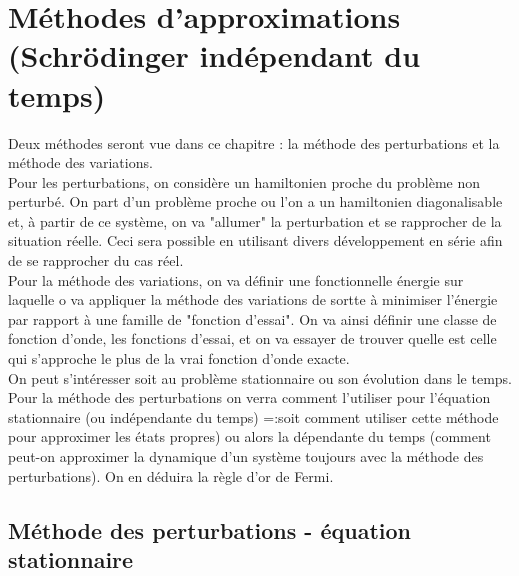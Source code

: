 \chapter{Méthodes d'approximations (Schrödinger indépendant du temps)}
Deux méthodes seront vue dans ce chapitre : la méthode des perturbations 
et la méthode des variations. \\

Pour les perturbations, on considère un hamiltonien proche du problème non perturbé. 
On part d'un problème proche ou l'on a un hamiltonien diagonalisable et, à partir de 
ce système, on va "allumer" la perturbation et se rapprocher de la situation réelle. 
Ceci sera possible en utilisant divers développement en série afin de se rapprocher 
du cas réel.\\

Pour la méthode des variations, on va définir une fonctionnelle énergie sur laquelle 
o va appliquer la méthode des variations de sortte à minimiser l'énergie par rapport 
à une famille de "fonction d'essai". On va ainsi définir une classe de fonction d'onde, 
les fonctions d'essai, et on va essayer de trouver quelle est celle qui s'approche le 
plus de la vrai fonction d'onde exacte. \\

On peut s'intéresser soit au problème stationnaire ou son évolution dans le temps. Pour 
la méthode des perturbations on verra comment l'utiliser pour l'équation stationnaire 
(ou indépendante du temps) =:soit comment utiliser cette méthode pour approximer les états 
propres) ou alors la dépendante du temps (comment peut-on approximer la dynamique d'un 
système toujours avec la méthode des perturbations). On en déduira la règle d'or de Fermi. 

\section{Méthode des perturbations - équation stationnaire}
